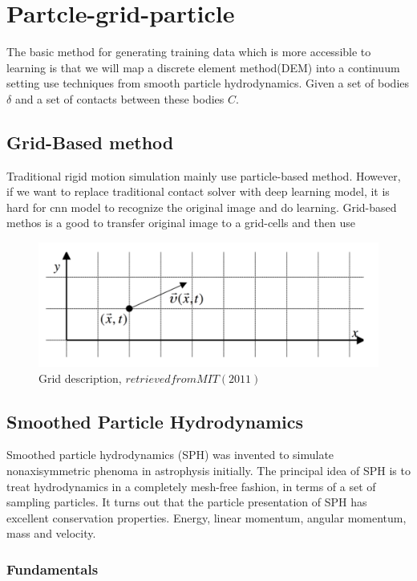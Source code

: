 \chapter{Partcle-grid-particle}
    The basic method for generating training data which is more accessible to learning is that we will map a discrete element method(DEM) into a continuum setting use techniques from smooth particle hydrodynamics. Given a set of bodies $\delta$ and a set of contacts between these bodies $C$.

\section{Grid-Based method}
    Traditional rigid motion simulation mainly use particle-based method. However, if we want to replace traditional contact solver with deep learning model, it is hard for cnn model to recognize the original image and do learning. Grid-based methos is a good to transfer original image to a grid-cells and then use

    \begin{figure}
        \centering
        \includegraphics[scale = 0.4]{Figures/grid_method.png}
        \caption{Grid description, $retrieved from MIT(2011)$}
    \end{figure}

\section{Smoothed Particle Hydrodynamics}
    Smoothed particle hydrodynamics (SPH) was invented to simulate nonaxisymmetric phenoma in astrophysis initially. The principal idea of SPH is to treat hydrodynamics in a completely mesh-free fashion, in terms of a set of sampling particles. It turns out that the particle presentation of SPH has excellent conservation properties. Energy, linear momentum, angular momentum, mass and velocity.

    \subsection{Fundamentals}

